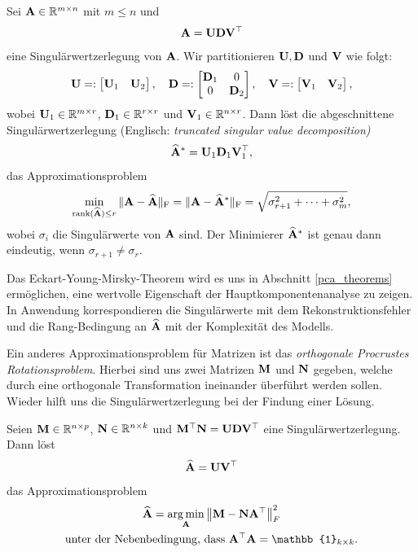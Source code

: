 \begin{thm}
Sei $\mathbf{A} \in \mathbb{R}^{m \times n}$ mit $m \leq n$ und 
$$\mathbf{A} = \mathbf{U}\mathbf{D} \mathbf{V}^{\top}$$
eine Singulärwertzerlegung von $\mathbf{A}$. Wir partitionieren $\mathbf{U}, \mathbf{D}$ und $\mathbf{V}$ wie folgt:
$$\mathbf{U} =: \begin{bmatrix} \mathbf{U}_1 & \mathbf{U}_2\end{bmatrix}, \quad 
\mathbf{D} =: \begin{bmatrix} \mathbf{D}_1 & 0 \\ 0 & \mathbf{D}_2 \end{bmatrix},\quad \mathbf{V} =: \begin{bmatrix} \mathbf{V}_1 & \mathbf{V}_2 \end{bmatrix},$$
wobei $\mathbf{U}_{1} \in \mathbb{R}^{m\times r}$, $\mathbf{D} _{1} \in \mathbb{R}^{r\times r}$ und $\mathbf{V}_{1} \in \mathbb{R}^{n\times r}$. Dann löst die abgeschnittene Singulärwertzerlegung (Englisch: \textit{truncated singular value decomposition)}
$$\widehat{\mathbf{A}}^* = \mathbf{U}_1 \mathbf{D}_1 \mathbf{V}_1^{\top},$$
das Approximationsproblem
\begin{align}
\min_{\operatorname{rank}(\widehat{\mathbf{A}}) \leq r} \|\mathbf{A}-\widehat{\mathbf{A}}\|_{\text{F}} = \|\mathbf{A}-\widehat{\mathbf{A}}^*\|_{\text{F}} = \sqrt{\sigma^2_{r+1} + \cdots + \sigma^2_m},
\end{align}
wobei $\sigma_i$ die Singulärwerte von $\mathbf{A}$ sind. Der Minimierer $\widehat{\mathbf{A}}^*$ ist genau dann eindeutig, wenn $\sigma_{r+1} \neq \sigma_{r}$.
\end{thm}

Das Eckart-Young-Mirsky-Theorem wird es uns in Abschnitt \ref{pca_theorems} ermöglichen, eine wertvolle Eigenschaft der Hauptkomponentenanalyse zu zeigen. In Anwendung korrespondieren die Singulärwerte mit dem Rekonstruktionsfehler und die Rang-Bedingung an $\widehat{\mathbf{A}}$ mit der Komplexität des Modells.

Ein anderes Approximationsproblem für Matrizen ist das \textit{orthogonale Procrustes Rotationsproblem}. Hierbei sind uns zwei Matrizen $\mathbf{M}$ und $\mathbf{N}$ gegeben, welche durch eine orthogonale Transformation ineinander überführt werden sollen. Wieder hilft uns die Singulärwertzerlegung bei der Findung einer Lösung.

\begin{thm}
Seien $\mathbf{M} \in \mathbb{R}^{n \times p}$, $\mathbf{N} \in \mathbb{R}^{n \times k}$ und $\mathbf{M}^{\top} \mathbf{N} = \mathbf{U}\mathbf{D} \mathbf{V}^{\top}$ eine Singulärwertzerlegung. Dann löst
$$\widehat{\mathbf{A}} = \mathbf{U} \mathbf{V}^{\top}$$
das Approximationsproblem
\begin{align}
\label{procrustes_rotation}
\begin{gathered}
\widehat{\mat A} = \argmin_{\mat A} \norm{\mat M - \mat N \mat A^{\top}}_F^2\\
\text{unter der Nebenbedingung, dass } \mat A^{\top} \mat A = \mat{\mathbb{1}}_{k \times k}.
\end{gathered}
\end{align}
\end{thm}

